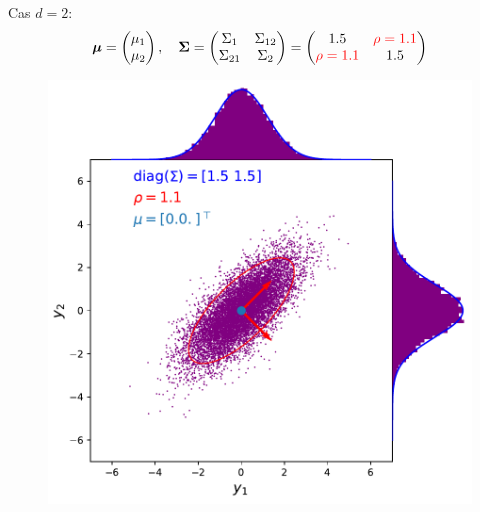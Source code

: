 \documentclass[xcolor=svgnames, t]{beamer}
\newcommand{\vectorx}[1]{\boldsymbol{\MakeLowercase{\mathbf{#1}}}}
\newcommand{\matrixx}[1]{\boldsymbol{\MakeUppercase{#1}}}
\begin{document}
\begin{frame}
  Cas $d=2$:
  \begin{equation*}
    \vectorx{\mu}
    =
    \begin{pmatrix}
      \mu_1 \\
      \mu_2
    \end{pmatrix},
    \quad
    \matrixx{\Sigma}
    =
      \begin{pmatrix}
        \Sigma_{1} & \Sigma_{12} \\
        \Sigma_{21} & \Sigma_{2}
      \end{pmatrix}
    =
      \begin{pmatrix}
        1.5 & \color{red}\rho = 1.1 \\
        \color{red}\rho = 1.1 & 1.5
      \end{pmatrix}
  \end{equation*}
% 
  \begin{figure}
    \includegraphics[scale=0.4]{gaussian_2d_rho_high.pdf}
  \end{figure}
\end{frame}
\end{document}
